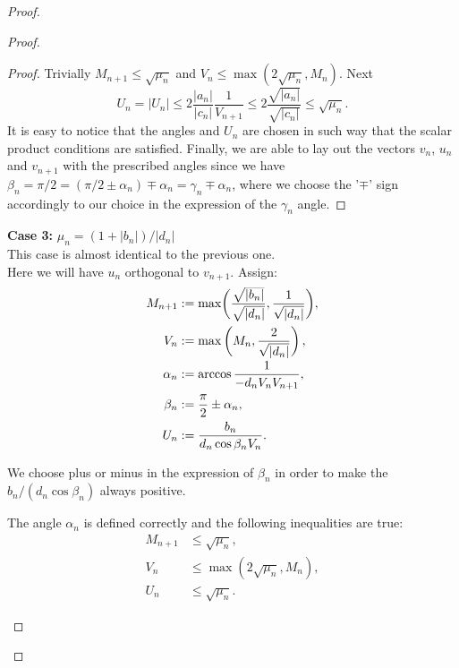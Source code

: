 \documentclass[12pt]{amsart}
\theoremstyle{case}
\begin{document}
\begin{proof}
\begin{proof}
\begin{proof}
                  Trivially $M_{n+1} \leq \sqrt{\mu_n}$ and $V_n \leq \max(2\sqrt{\mu_n}, M_n)$. Next
                  $$
                      U_n = |U_n| \leq 2 \frac{|a_n|}{|c_n|} \frac{1}{V_{n+1}} \leq 2 \frac{\sqrt{|a_n|}}{\sqrt{|c_n|}} \leq \sqrt{\mu_n}.
                  $$
                  It is easy to notice that the angles and $U_n$ are chosen in such way that the scalar product conditions are 
                  satisfied.
                  Finally, we are able to lay out the vectors $v_n$, $u_n$ and $v_{n+1}$ with the prescribed angles 
                  since we have $\beta_n = \pi/2 = (\pi/2 \pm \alpha_n) \mp \alpha_n = \gamma_n \mp \alpha_n$,
                  where we choose the '$\mp$' sign accordingly to our choice in the expression of the $\gamma_n$ angle.
              \end{proof}
          \noindent\textbf{Case 3:} $\mu_n = (1 + |b_n|)/|d_n|$\\
              This case is almost identical to the previous one.\\
              Here we will have $u_n$ orthogonal to $v_{n+1}$.
              Assign:
              \begin{align*}
                  M_{n+1} &:= \max\biggl(\smash[t]{\frac{\sqrt{|b_n|}}{\sqrt{|d_n|}}}, \frac{1}{\sqrt{\smash[b]{|d_n|}}}\biggr),\\
                  V_n &:= \max\left(M_n, \frac{2}{\sqrt{\smash[b]{|d_n|}}}\right),\\
                  \alpha_n &:= \arccos{\frac{1}{-d_n V_n V_{n+1}}},\\
                  \beta_n &:= \frac{\pi}{2} \pm \alpha_n,\\
                  U_n &:= \frac{b_n}{d_n \cos{\beta_n} V_n}.
              \end{align*}
              \begin{remark*}
                  We choose plus or minus in the expression of $\beta_n$ in order to make the $b_n/(d_n \cos{\beta_n})$ always positive.
              \end{remark*}
              \begin{prop}
                  The angle $\alpha_n$ is defined correctly and the following inequalities are true:
                  \begin{align*}
                      M_{n+1} &\leq \sqrt{\mu_n},\\
                      V_n &\leq \max(2\sqrt{\mu_n}, M_n),\\
                      U_n &\leq \sqrt{\mu_n}.

\end{align*}
\end{prop}
\end{proof}
\end{proof}
\end{document}
